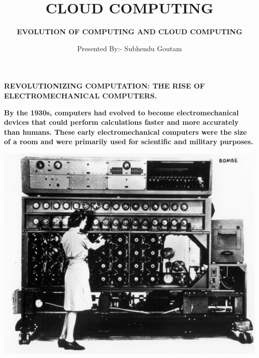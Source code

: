 \documentclass[pdf,aspectratio=169]{beamer}
\title{\textbf{CLOUD COMPUTING}}
\subtitle{\textbf{EVOLUTION OF COMPUTING AND CLOUD COMPUTING}}
\author{Presented By:- Subhendu Goutam}
\begin{document}
\begin{frame}
	\titlepage
\end{frame}

\begin{frame}{\textbf{REVOLUTIONIZING COMPUTATION: THE RISE OF ELECTROMECHANICAL COMPUTERS.}}
	\begin{minipage}{0.6\textwidth}
		\textbf {\text By the 1930s, computers had evolved to become electromechanical devices that could perform calculations faster and more accurately than humans. These early electromechanical computers were the size of a room and were primarily used for scientific and military purposes.} 
	\end{minipage}
	\hfill
	\begin{minipage}{0.3\textwidth}
		\centering
		\includegraphics[width=\textwidth]{figs/IMG1}
	\end{minipage}
\end{frame}
\end{document}

